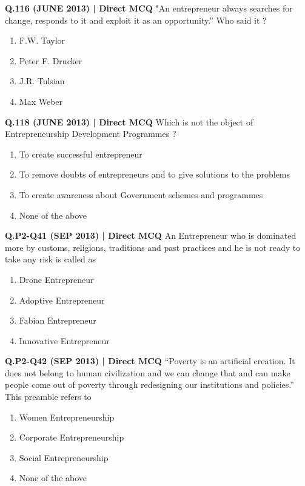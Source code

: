 \documentclass{article}
\begin{document}
\textbf{Q.116 (JUNE 2013) | Direct MCQ}
"An entrepreneur always searches for change, responds to it and exploit it as an opportunity.” Who said it ?
\begin{enumerate}[label=(\arabic*)]
    \item F.W. Taylor
    \item Peter F. Drucker
    \item J.R. Tulsian
    \item Max Weber
\end{enumerate}

\textbf{Q.118 (JUNE 2013) | Direct MCQ}
Which is not the object of Entrepreneurship Development Programmes ?
\begin{enumerate}[label=(\arabic*)]
    \item To create successful entrepreneur
    \item To remove doubts of entrepreneurs and to give solutions to the problems
    \item To create awareness about Government schemes and programmes
    \item None of the above
\end{enumerate}

\textbf{Q.P2-Q41 (SEP 2013) | Direct MCQ}
An Entrepreneur who is dominated more by customs, religions, traditions and past practices and he is not ready to take any risk is called as
\begin{enumerate}[label=(\arabic*)]
    \item Drone Entrepreneur
    \item Adoptive Entrepreneur
    \item Fabian Entrepreneur
    \item Innovative Entrepreneur
\end{enumerate}

\textbf{Q.P2-Q42 (SEP 2013) | Direct MCQ}
“Poverty is an artificial creation. It does not belong to human civilization and we can change that and can make people come out of poverty through redesigning our institutions and policies.” This preamble refers to
\begin{enumerate}[label=(\arabic*)]
    \item Women Entrepreneurship
    \item Corporate Entrepreneurship
    \item Social Entrepreneurship
    \item None of the above
\end{enumerate}
\end{document}
